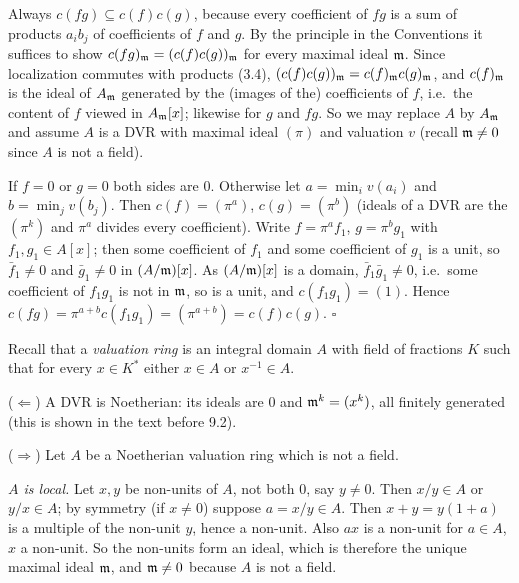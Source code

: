 \documentclass[11pt]{article}
\begin{document}
\pf
Always $c(fg)\subseteq c(f)c(g)$, because every coefficient of $fg$ is a sum of products $a_ib_j$ of coefficients of $f$ and $g$. By the principle in the Conventions it suffices to show $c(fg)_\mathfrak m=(c(f)c(g))_\mathfrak m$ for every maximal ideal $\mathfrak m$. Since localization commutes with products (3.4), $(c(f)c(g))_\mathfrak m=c(f)_\mathfrak m c(g)_\mathfrak m$, and $c(f)_\mathfrak m$ is the ideal of $A_\mathfrak m$ generated by the (images of the) coefficients of $f$, i.e.\ the content of $f$ viewed in $A_\mathfrak m[x]$; likewise for $g$ and $fg$. So we may replace $A$ by $A_\mathfrak m$ and assume $A$ is a DVR with maximal ideal $(\pi)$ and valuation $v$ (recall $\mathfrak m\ne0$ since $A$ is not a field).

If $f=0$ or $g=0$ both sides are $0$. Otherwise let $a=\min_iv(a_i)$ and $b=\min_jv(b_j)$. Then $c(f)=(\pi^a)$, $c(g)=(\pi^b)$ (ideals of a DVR are the $(\pi^k)$ and $\pi^a$ divides every coefficient). Write $f=\pi^af_1$, $g=\pi^bg_1$ with $f_1,g_1\in A[x]$; then some coefficient of $f_1$ and some coefficient of $g_1$ is a unit, so $\bar f_1\ne0$ and $\bar g_1\ne0$ in $(A/\mathfrak m)[x]$. As $(A/\mathfrak m)[x]$ is a domain, $\bar f_1\bar g_1\ne0$, i.e.\ some coefficient of $f_1g_1$ is not in $\mathfrak m$, so is a unit, and $c(f_1g_1)=(1)$. Hence $c(fg)=\pi^{a+b}c(f_1g_1)=(\pi^{a+b})=c(f)c(g)$. \hfill$\square$

\pf
Recall that a \emph{valuation ring} is an integral domain $A$ with field of fractions $K$ such that for every $x\in K^*$ either $x\in A$ or $x^{-1}\in A$.

($\Leftarrow$) A DVR is Noetherian: its ideals are $0$ and $\mathfrak m^k=(x^k)$, all finitely generated (this is shown in the text before 9.2).

($\Rightarrow$) Let $A$ be a Noetherian valuation ring which is not a field.

\emph{$A$ is local.} Let $x,y$ be non-units of $A$, not both $0$, say $y\ne0$. Then $x/y\in A$ or $y/x\in A$; by symmetry (if $x\ne0$) suppose $a=x/y\in A$. Then $x+y=y(1+a)$ is a multiple of the non-unit $y$, hence a non-unit. Also $ax$ is a non-unit for $a\in A$, $x$ a non-unit. So the non-units form an ideal, which is therefore the unique maximal ideal $\mathfrak m$, and $\mathfrak m\ne0$ because $A$ is not a field.
\end{document}
